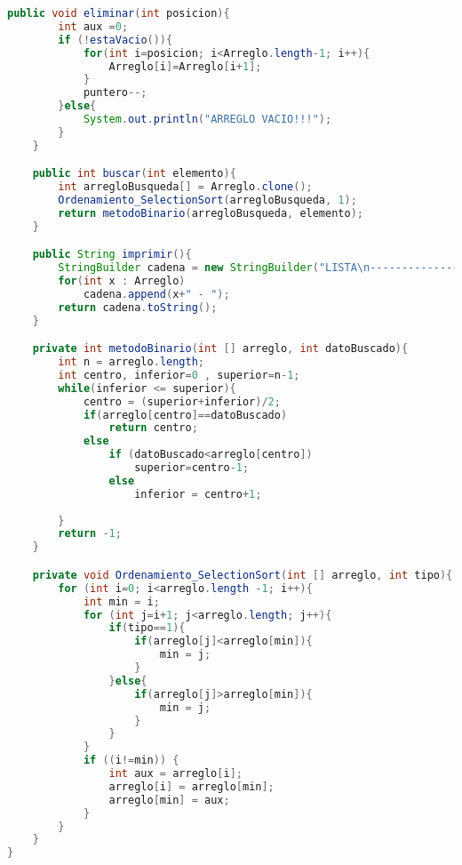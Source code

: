 \documentclass{article}
\begin{document}
\begin{itemize}
\begin{itemize}
\begin{lstlisting}[language=java]
    public void eliminar(int posicion){
        int aux =0;
        if (!estaVacio()){
            for(int i=posicion; i<Arreglo.length-1; i++){
                Arreglo[i]=Arreglo[i+1];
            }
            puntero--;
        }else{
            System.out.println("ARREGLO VACIO!!!");
        }
    }

    public int buscar(int elemento){
        int arregloBusqueda[] = Arreglo.clone();
        Ordenamiento_SelectionSort(arregloBusqueda, 1);
        return metodoBinario(arregloBusqueda, elemento);
    }

    public String imprimir(){
        StringBuilder cadena = new StringBuilder("LISTA\n---------------------------\n");
        for(int x : Arreglo)
            cadena.append(x+" - ");
        return cadena.toString();
    }

    private int metodoBinario(int [] arreglo, int datoBuscado){
        int n = arreglo.length;
        int centro, inferior=0 , superior=n-1;
        while(inferior <= superior){
            centro = (superior+inferior)/2;
            if(arreglo[centro]==datoBuscado)
                return centro;
            else
                if (datoBuscado<arreglo[centro])
                    superior=centro-1;
                else 
                    inferior = centro+1;
            
        }
        return -1;
    }

    private void Ordenamiento_SelectionSort(int [] arreglo, int tipo){
        for (int i=0; i<arreglo.length -1; i++){
            int min = i;
            for (int j=i+1; j<arreglo.length; j++){
                if(tipo==1){
                    if(arreglo[j]<arreglo[min]){
                        min = j;
                    }
                }else{
                    if(arreglo[j]>arreglo[min]){
                        min = j;
                    }
                }
            }
            if ((i!=min)) {
                int aux = arreglo[i];
                arreglo[i] = arreglo[min];
                arreglo[min] = aux;
            }
        }
    }
}


\end{lstlisting}
\end{itemize}
\end{itemize}
\end{document}
